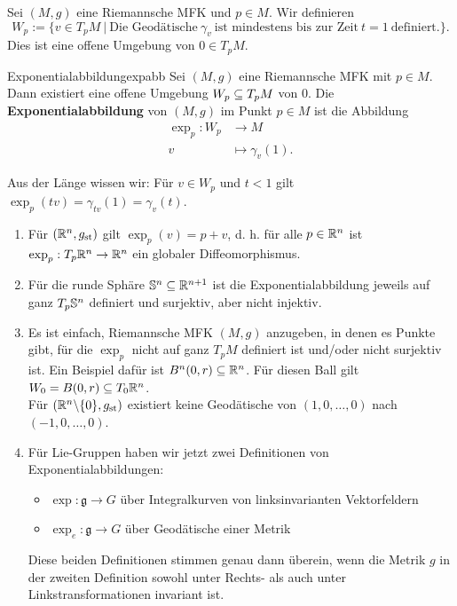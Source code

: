Sei $(M,g)$ eine Riemannsche MFK und $p \in M$. Wir definieren
\begin{equation}
W_p  := \{ v \in T_pM \ | \ \text{Die Geodätische} \ \gamma_v \ \text{ist mindestens bis zur Zeit} \ t=1 \ \text{definiert.}\}.
\end{equation}
Dies ist eine offene Umgebung von $0 \in T_pM$.

\begin{definition}{Exponentialabbildung}{expabb}
Sei $(M,g)$ eine Riemannsche MFK mit $p \in M$. Dann existiert eine offene Umgebung $W_p \subseteq T_pM$ von $0$. Die \textbf{Exponentialabbildung} von $(M,g)$ im Punkt $p \in M$ ist die Abbildung
\begin{align}
\exp_p: W_p &\to M \\
v &\mapsto \gamma_v (1).
\end{align}
\end{definition}
Aus der Länge wissen wir: Für $v \in W_p$ und $t<1$ gilt $\exp_p (tv) = \gamma_{tv} (1) = \gamma_v (t)$.
\begin{beispiele}
\begin{enumerate}
\item Für $(\mathbb{R}^n, g_\text{st})$ gilt $\exp_p (v) = p+v$, d. h. für alle $p \in \mathbb{R}^n$ ist $\exp_p: T_p\mathbb{R}^n \to \mathbb{R}^n$ ein globaler Diffeomorphismus.
\item Für die runde Sphäre $\mathbb{S}^n \subseteq \mathbb{R}^{n+1}$ ist die Exponentialabbildung jeweils auf ganz $T_p \mathbb{S}^n$ definiert und surjektiv, aber nicht injektiv.
\item Es ist einfach, Riemannsche MFK $(M,g)$ anzugeben, in denen es Punkte gibt, für die $\exp_p$ nicht auf ganz $T_pM$ definiert ist und/oder nicht surjektiv ist. Ein Beispiel dafür ist $B^n(0,r) \subseteq \mathbb{R}^n$. Für diesen Ball gilt $W_0 = B(0,r) \subseteq T_0 \mathbb{R}^n$.\\
Für $(\mathbb{R}^n \backslash \{0\}, g_\text{st})$ existiert keine Geodätische von $(1,0, \dots, 0)$ nach $(-1, 0, \dots, 0 )$.
\item Für Lie-Gruppen haben wir jetzt zwei Definitionen von Exponentialabbildungen:
\begin{itemize}
\item $\exp: \mathfrak{g} \to G$ über Integralkurven von linksinvarianten Vektorfeldern
\item $\exp_e: \mathfrak{g} \to G$ über Geodätische einer Metrik
\end{itemize}
Diese beiden Definitionen stimmen genau dann überein, wenn die Metrik $g$ in der zweiten Definition sowohl unter Rechts- als auch unter Linkstransformationen invariant ist.
\end{enumerate}
\end{beispiele}
